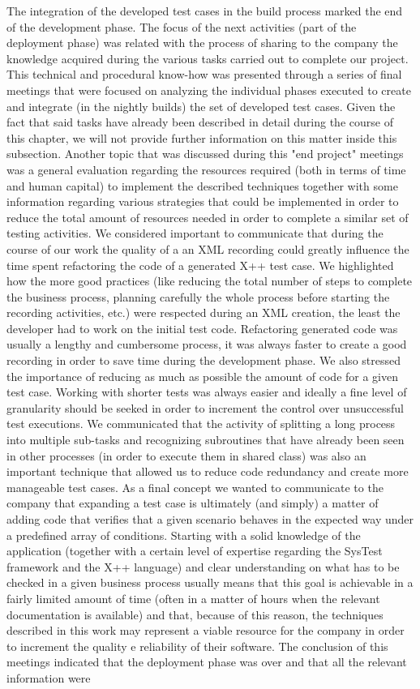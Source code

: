 The integration of the developed test cases in the build process marked the end of the development phase. The focus of the next activities (part of the deployment phase) was related with the process of sharing to the company the knowledge acquired during the various tasks carried out to complete our project. This technical and procedural know-how was presented through a series of final meetings that were focused on analyzing the individual phases executed to create and integrate (in the nightly builds) the set of developed test cases. Given the fact that said tasks have already been described in detail during the course of this chapter, we will not provide further information on this matter inside this subsection. Another topic that was discussed during this "end project" meetings was a general evaluation regarding the resources required (both in terms of time and human capital) to implement the described techniques together with some information regarding various strategies that could be implemented in order to reduce the total amount of resources needed in order to complete a similar set of testing activities. We considered important to communicate that during the course of our work the quality of a an XML recording could greatly influence the time spent refactoring the code of a generated X++ test case. We highlighted how the more good practices (like reducing the total number of steps to complete the business process, planning carefully the whole process before starting the recording activities, etc.) were respected during an XML creation, the least the developer had to work on the initial test code. Refactoring generated code was usually a lengthy and cumbersome process, it was always faster to create a good recording in order to save time during the development phase. We also stressed the importance of reducing as much as possible the amount of code for a given test case. Working with shorter tests was always easier and ideally a fine level of granularity should be seeked in order to increment the control over unsuccessful test executions. We communicated that the activity of splitting a long process into multiple sub-tasks and recognizing subroutines that have already been seen in other processes (in order to execute them in shared class) was also an important technique that allowed us to reduce code redundancy and create more manageable test cases. As a final concept we wanted to communicate to the company that expanding a test case is ultimately (and simply) a matter of adding code that verifies that a given scenario behaves in the expected way under a predefined array of conditions. Starting with a solid knowledge of the application (together with a certain level of expertise regarding the SysTest framework and the X++ language) and clear understanding on what has to be checked in a given business process usually means that this goal is achievable in a fairly limited amount of time (often in a matter of hours when the relevant documentation is available) and that, because of this reason, the  techniques described in this work may represent a viable resource for the company in order to increment the quality e reliability of their software. The conclusion of this meetings indicated that the deployment phase was over and that all the relevant information were 